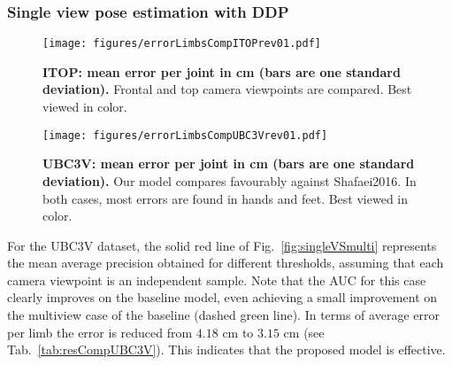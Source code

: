 \documentclass[review,12pt,3p]{elsarticle}
\begin{document}
\subsubsection{Single view pose estimation with DDP}
%
\begin{figure}[tb]
\centering
   \texttt{[image: figures/errorLimbsCompITOPrev01.pdf]}
   \caption{\textbf{ITOP: mean error per joint in cm (bars are one standard deviation).} Frontal and top camera viewpoints are compared. Best viewed in color.}
   \label{fig:jointsErrorCNNitop}
\end{figure}

\begin{figure}[tb]
\centering
   \texttt{[image: figures/errorLimbsCompUBC3Vrev01.pdf]}
   \caption{\textbf{UBC3V: mean error per joint in cm (bars are one standard deviation).} Our model compares favourably against Shafaei2016. In both cases, most errors are found in hands and feet. Best viewed in color.}
   \label{fig:jointsErrorCNN}
\end{figure}
%
For the UBC3V dataset, the solid red line of Fig.~\ref{fig:singleVSmulti} represents the mean average precision obtained for different thresholds, assuming that each camera viewpoint is an independent sample. Note that the AUC for this case clearly improves on the baseline model, even achieving a small improvement on the multiview case of the baseline (dashed green line). In terms of average error per limb the error is reduced from $4.18$ cm to $3.15$ cm (see Tab.~\ref{tab:resCompUBC3V}). This indicates that the proposed model is effective.
\end{document}

